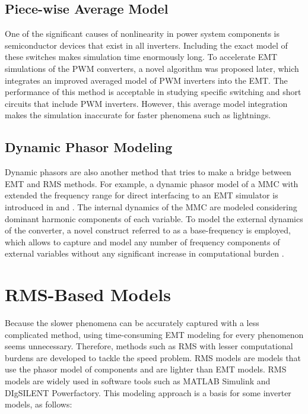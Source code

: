\subsection{Piece-wise Average Model}
One of the significant causes of nonlinearity in power system components is semiconductor devices that exist in all inverters. Including the exact model of these switches makes simulation time enormously long. To accelerate EMT simulations of the PWM converters, a novel algorithm was proposed later, which integrates an improved averaged model of \gls{PWM} inverters into the \gls{EMT}. \cite{ImprovedAvg} The performance of this method is acceptable in studying specific switching and short circuits that include \gls{PWM} inverters. However, this average model integration makes the simulation inaccurate for faster phenomena such as lightnings. 

\subsection{Dynamic Phasor Modeling}
Dynamic phasors are also another method that tries to make a bridge between \gls{EMT} and \gls{RMS} methods. For example, a dynamic phasor model of a \gls{MMC} with extended
the frequency range for direct interfacing to an EMT simulator is introduced in \cite{DP} and \cite{DP2}. The internal dynamics of the \gls{MMC}
are modeled considering dominant harmonic components of
each variable. To model the external dynamics of the converter,
a novel construct referred to as a base-frequency is employed,
which allows to capture and model any number of frequency
components of external variables without any significant increase in
computational burden \cite{DP}.


\section{\gls{RMS}-Based Models}

Because the slower phenomena can be accurately captured with a less complicated method, using time-consuming EMT modeling for every phenomenon seems unnecessary. Therefore, methods such as \gls{RMS} with lesser computational burdens are developed to tackle the speed problem. \gls{RMS} models are models that use the phasor model of components and are lighter than EMT models. \gls{RMS} models are widely used in software tools such as MATLAB Simulink and DIgSILENT Powerfactory. This modeling approach is a basis for some inverter models, as follows:

